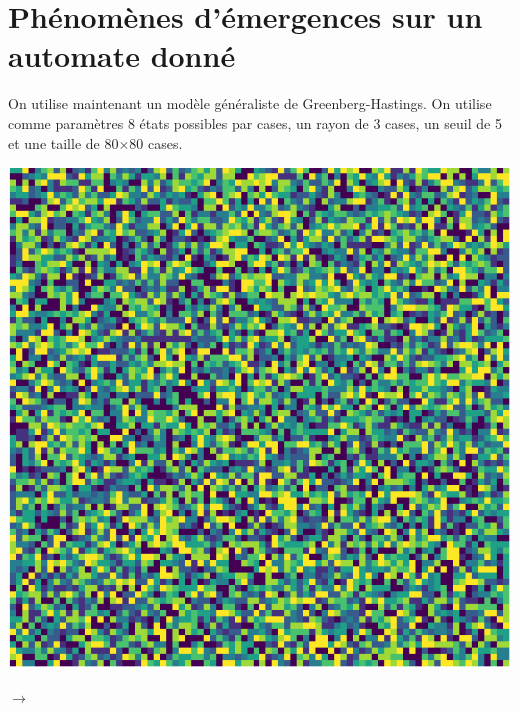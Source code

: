 \documentclass[12pt, a4paper]{article}
\begin{document}
    
    \section{Phénomènes d'émergences sur un automate donné}
        \begin{flushleft}
            On utilise maintenant un modèle généraliste de Greenberg-Hastings. On utilise comme paramètres 8 états possibles par cases, un rayon de 3 cases, un seuil de 5 et une taille de 80$\times$80 cases.
        \end{flushleft}
        \begin{center}
            \begin{minipage}{.17\linewidth}
                \includegraphics[scale=0.15]{img/part2/step1.png}
            \end{minipage}
            $\rightarrow$
            \begin{minipage}{.17\linewidth}

\end{minipage}
\end{center}
\end{document}
